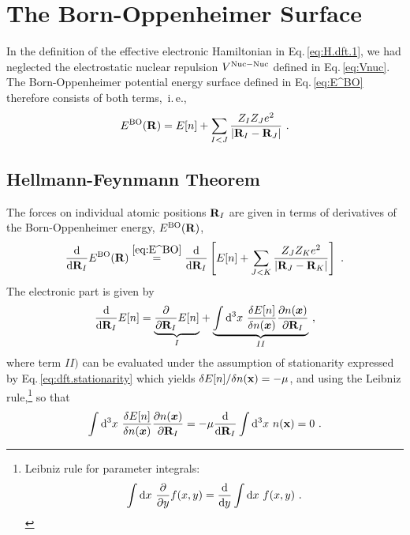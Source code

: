 \newpage

\section{The Born-Oppenheimer Surface}
In the definition of the effective electronic Hamiltonian in Eq.\,\eqref{eq:H.dft.1}, we had neglected the electrostatic nuclear repulsion $V^{\rm Nuc-Nuc}$ defined in Eq.\,\eqref{eq:Vnuc}. The Born-Oppenheimer potential energy surface defined in Eq.\,\eqref{eq:E^BO} therefore consists of both terms,~i.\,e.,
\begin{align}
	E^{\rm BO} ({\bf R}) 
		= E[n] + \sum_{I < J} \frac{Z_{I} Z_{J} e^{2}}{\left|{\bf R}_{I}-{\bf R}_{J}\right|}~.
	\label{eq:E^BO}
\end{align}

\subsection{Hellmann-Feynmann Theorem}
\label{sec:HellmannFeynman}
The forces on individual atomic positions ${\bf R}_I$ are given in terms of derivatives of the Born-Oppenheimer energy, $E^{\rm BO} ({\bf R})$,
\begin{align}
	\frac{\d}{\d {\bf R}_I} E^{\rm BO} ({\bf R})
		\stackrel{\eqref{eq:E^BO}}{=}
			\frac{\d}{\d {\bf R}_I } \left[
				E[n] + \sum_{J < K} \frac{Z_{J} Z_{K} e^{2}}{\left|{\b R}_{J}-{\bf R}_{K}\right|}
			\right]
			~.
	\label{eq:hellmannfeynman.1}
\end{align}
The electronic part is given by
\begin{align}
		\frac{\d}{\d {\bf R}_I} E[n]
			= 
				\underset{I}{\underbrace{\frac{\partial}{\partial {\bf R}_I} E[n]}}
			+ \underset{II}{\underbrace{
					\int \d^{3} x ~ \frac{\delta E[n]}{\delta n(\boldsymbol{x})} \frac{\partial n(\boldsymbol{x})}{\partial {\bf R}_{I}}
				}}~,
		\label{eq:hellmannfeynman.2}
\end{align}
where term $II)$ can be evaluated under the assumption of stationarity expressed by Eq.\,\eqref{eq:dft.stationarity} which yields 
\mbox{$\delta E[n] / \delta n({\bf x}) = -\mu$},
and using the Leibniz rule,\footnote{Leibniz rule for parameter integrals:
	\begin{align*}
		\int {\rm d} x ~ \frac{\partial}{\partial y} f(x, y) 
			= \frac{{\rm d}}{{\rm d} y} \int {\rm d} x ~ f(x, y)~.
	\end{align*}
} so that
\begin{align}
	\int \d^{3} x ~ \frac{\delta E[n]}{\delta n(\boldsymbol{x})} \frac{\partial n(\boldsymbol{x})}{\partial {\bf R}_{I}}
	= -\mu \frac{\d}{\d {\bf R}_I} \int \d^{3} x ~ n ({\bf x})
	= 0~.
	\label{eq:hellmannfeynman.3}
\end{align}
